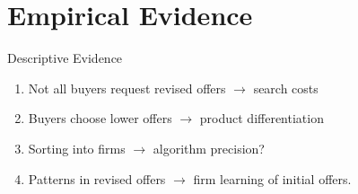 \documentclass[10pt,aspectratio=169]{beamer}
\begin{document}

\section{Empirical Evidence}
 
\begin{frame}{Descriptive Evidence}\label{slide:Descriptive_evidence}

\begin{enumerate}
    \item Not all buyers request revised offers  $\rightarrow$ search costs \hyperlink{slide:fig1}{}
    \item Buyers choose lower offers $\rightarrow$ product differentiation  \hyperlink{slide:fig2}{} 
    \item Sorting into firms $\rightarrow$ algorithm precision?  \hyperlink{slide:fig3}{}
    \item Patterns in revised offers $\rightarrow$ firm learning of initial offers.   \hyperlink{slide:fig4}{} 
\end{enumerate}
\end{frame}
\end{document}
